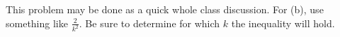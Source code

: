 \documentclass[handout]{ximera}
\begin{document}
\begin{instructorNotes}
This problem may be done as a quick whole class discussion.  
For (b), use something like $\frac{2}{k^2}$.  
Be sure to determine for which $k$ the inequality will hold.
\end{instructorNotes}

%	
%	
%	
%	
%	
%		
%		
%		
%		
%		
%		
%		
%		
%		
%		
%		
%		
%	
%
\end{document}
